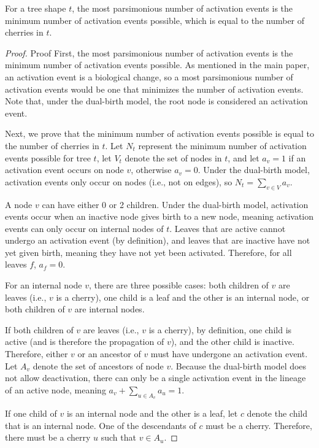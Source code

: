 \begin{lemma}\label{lem:cherryparsimony} %
For a tree shape $t$, the most parsimonious number of activation events is the minimum number of activation events possible, which is equal to the number of cherries in $t$.
\end{lemma}

\begin{proof}{Proof}
First, the most parsimonious number of activation events is the minimum number of activation events possible. As mentioned in the main paper, an activation event is a biological change, so a most parsimonious number of activation events would be one that minimizes the number of activation events. Note that, under the dual-birth model, the root node is considered an activation event.

Next, we prove that the minimum number of activation events possible is equal to the number of cherries in $t$. Let $N_t$ represent the minimum number of activation events possible for tree $t$, let $V_t$ denote the set of nodes in $t$, and let $a_v = 1$ if an activation event occurs on node $v$, otherwise $a_v = 0$. Under the dual-birth model, activation events only occur on nodes (i.e., not on edges), so $N_t = \sum_{v \in V}{a_v}$.

A node $v$ can have either 0 or 2 children. Under the dual-birth model, activation events occur when an inactive node gives birth to a new node, meaning activation events can only occur on internal nodes of $t$. Leaves that are active cannot undergo an activation event (by definition), and leaves that are inactive have not yet given birth, meaning they have not yet been activated. Therefore, for all leaves $f$, $a_f = 0$.

For an internal node $v$, there are three possible cases: both children of $v$ are leaves (i.e., $v$ is a cherry), one child is a leaf and the other is an internal node, or both children of $v$ are internal nodes.

If both children of $v$ are leaves (i.e., $v$ is a cherry), by definition, one child is active (and is therefore the propagation of $v$), and the other child is inactive. Therefore, either $v$ or an ancestor of $v$ must have undergone an activation event. Let $A_v$ denote the set of ancestors of node $v$. Because the dual-birth model does not allow deactivation, there can only be a single activation event in the lineage of an active node, meaning $a_v + \sum_{u \in A_v}{a_u} = 1$.

If one child of $v$ is an internal node and the other is a leaf, let $c$ denote the child that is an internal node. One of the descendants of $c$ must be a cherry. Therefore, there must be a cherry $u$ such that $v \in A_u$.


\end{proof}
